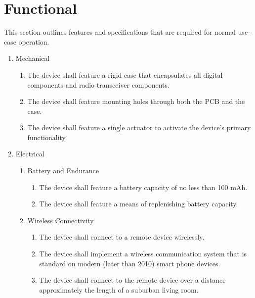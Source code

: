 \documentclass[twoside]{article}
\begin{document}
\section{Functional}
This section outlines features and specifications that are required for normal use-case operation.
\begin{enumerate}

\item Mechanical
  \begin{enumerate}

  \item The device shall feature a rigid case that encapsulates all digital components and radio transceiver components.
  
  \item The device shall feature mounting holes through both the PCB and the case.
  
  \item The device shall feature a single actuator to activate the device's primary functionality.

  \end{enumerate}

\item Electrical
  \begin{enumerate}

  \item Battery and Endurance
    \begin{enumerate}

    \item The device shall feature a battery capacity of no less than 100 mAh.
	
	\item The device shall feature a means of replenishing battery capacity.

    \end{enumerate}

  \item Wireless Connectivity

    \begin{enumerate}

    \item The device shall connect to a remote device wirelessly.

    \item The device shall implement a wireless communication system that is standard on modern (later than 2010) smart phone devices.

    \item The device shall connect to the remote device over a distance approximately the length of a suburban living room.


\end{enumerate}
\end{enumerate}
\end{enumerate}
\end{document}
